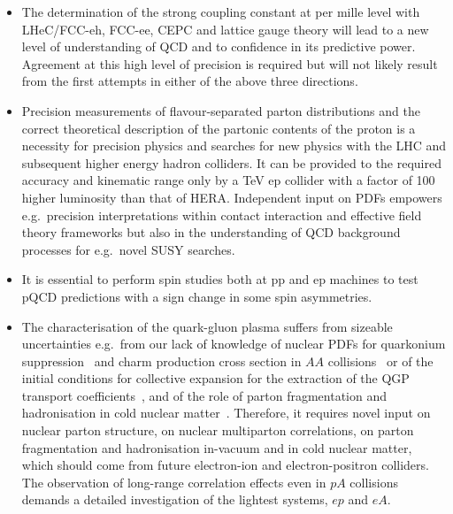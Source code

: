 \begin{itemize}

\item The determination of the strong coupling constant at per mille level
with LHeC/FCC-eh, FCC-ee, CEPC  and lattice gauge theory will lead to a new level of
understanding of QCD and to confidence in its predictive power. Agreement at
this high level of precision is required but will not likely result from the
first attempts in either of the above three directions.

\item Precision measurements of flavour-separated parton distributions and the
correct theoretical description of the partonic contents of the proton is a
necessity for precision physics and searches for new physics with the LHC and
subsequent higher energy hadron colliders. It can be provided to the required
accuracy and kinematic range only by a TeV ep collider with a factor of 100
higher luminosity than that of HERA. Independent input on PDFs empowers e.g.\
precision interpretations within contact interaction and effective field theory
frameworks but also in the understanding of QCD background processes for e.g.\
novel SUSY searches.

\item It is essential to perform spin studies both at pp and ep machines to test
pQCD predictions with a sign change in some spin asymmetries.

\item The characterisation of the quark-gluon plasma suffers from  sizeable
uncertainties e.g.\ from our lack of knowledge of nuclear PDFs for quarkonium
suppression~\cite{Andronic:2015wma} and  charm production cross section in $AA$ collisions~\cite{Andronic:2017pug}  or of the initial conditions for collective
expansion for the extraction of the QGP transport
coefficients~\cite{Niemi:2015qia,Schenke:2012wb}, and of the role of parton fragmentation and hadronisation in cold nuclear
matter~\cite{Accardi:2009qv}. Therefore, it requires novel
input on nuclear parton structure, on nuclear multiparton correlations, on parton
fragmentation and hadronisation in-vacuum and in cold nuclear matter, which
should come from future electron-ion and
electron-positron colliders. The observation of long-range correlation effects
even in $pA$ collisions demands a detailed investigation of the lightest systems,
$ep$ and $eA$.


\end{itemize}
